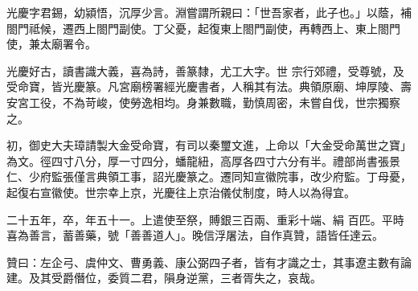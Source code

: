\begin{pinyinscope}
 光慶字君錫，幼潁悟，沉厚少言。淵嘗謂所親曰：「世吾家者，此子也。」以蔭，補閤門祗候，遷西上閤門副使。丁父憂，起復東上閤門副使，再轉西上、東上閤門使，兼太廟署令。



 光慶好古，讀書識大義，喜為詩，善篆隸，尤工大字。世
 宗行郊禮，受尊號，及受命寶，皆光慶篆。凡宮廟榜署經光慶書者，人稱其有法。典領原廟、坤厚陵、壽安宮工役，不為苛峻，使勞逸相均。身兼數職，勤慎周密，未嘗自伐，世宗獨察之。



 初，御史大夫璋請製大金受命寶，有司以秦璽文進，上命以「大金受命萬世之寶」為文。徑四寸八分，厚一寸四分，蟠龍紐，高厚各四寸六分有半。禮部尚書張景仁、少府監張僅言典領工事，詔光慶篆之。遷同知宣徽院事，改少府監。丁母憂，起復右宣徽使。世宗幸上京，光慶往上京治儀仗制度，時人以為得宜。



 二十五年，卒，年五十一。上遣使至祭，賻銀三百兩、重彩十端、絹
 百匹。平時喜為善言，蓄善藥，號「善善道人」。晚信浮屠法，自作真贊，語皆任達云。



 贊曰：左企弓、虞仲文、曹勇義、康公弼四子者，皆有才識之士，其事遼主數有論建。及其受爵僭位，委質二君，隕身逆黨，三者胥失之，哀哉。



\end{pinyinscope}